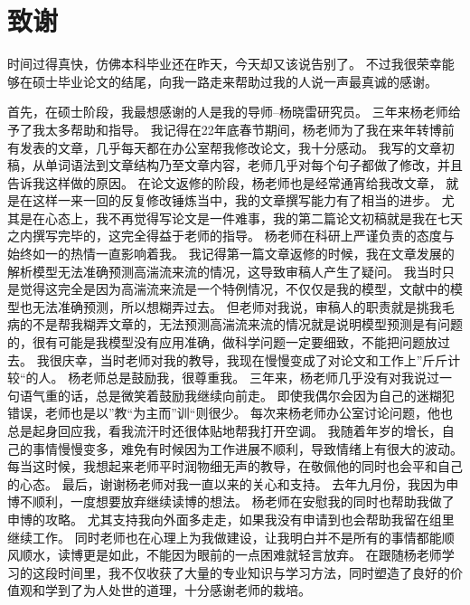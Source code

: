 \chapter[致谢]{致\quad 谢}%
时间过得真快，仿佛本科毕业还在昨天，今天却又该说告别了。
不过我很荣幸能够在硕士毕业论文的结尾，向我一路走来帮助过我的人说一声最真诚的感谢。

首先，在硕士阶段，我最想感谢的人是我的导师--杨晓雷研究员。
三年来杨老师给予了我太多帮助和指导。
我记得在22年底春节期间，杨老师为了我在来年转博前有发表的文章，几乎每天都在办公室帮我修改论文，我十分感动。
我写的文章初稿，从单词语法到文章结构乃至文章内容，老师几乎对每个句子都做了修改，并且告诉我这样做的原因。
在论文返修的阶段，杨老师也是经常通宵给我改文章，
就是在这样一来一回的反复修改锤炼当中，我的文章撰写能力有了相当的进步。
尤其是在心态上，我不再觉得写论文是一件难事，我的第二篇论文初稿就是我在七天之内撰写完毕的，这完全得益于老师的指导。
杨老师在科研上严谨负责的态度与始终如一的热情一直影响着我。
我记得第一篇文章返修的时候，我在文章发展的解析模型无法准确预测高湍流来流的情况，这导致审稿人产生了疑问。
我当时只是觉得这完全是因为高湍流来流是一个特例情况，不仅仅是我的模型，文献中的模型也无法准确预测，所以想糊弄过去。
但老师对我说，审稿人的职责就是挑我毛病的不是帮我糊弄文章的，无法预测高湍流来流的情况就是说明模型预测是有问题的，很有可能是我模型没有应用准确，做科学问题一定要细致，不能把问题放过去。
我很庆幸，当时老师对我的教导，我现在慢慢变成了对论文和工作上”斤斤计较“的人。
%
杨老师总是鼓励我，很尊重我。
三年来，杨老师几乎没有对我说过一句语气重的话，总是微笑着鼓励我继续向前走。
即使我偶尔会因为自己的迷糊犯错误，老师也是以”教“为主而”训“则很少。
每次来杨老师办公室讨论问题，他也总是起身回应我，看我流汗时还很体贴地帮我打开空调。
我随着年岁的增长，自己的事情慢慢变多，难免有时候因为工作进展不顺利，导致情绪上有很大的波动。
每当这时候，我想起来老师平时润物细无声的教导，在敬佩他的同时也会平和自己的心态。
%
最后，谢谢杨老师对我一直以来的关心和支持。
去年九月份，我因为申博不顺利，一度想要放弃继续读博的想法。
杨老师在安慰我的同时也帮助我做了申博的攻略。
尤其支持我向外面多走走，如果我没有申请到也会帮助我留在组里继续工作。
同时老师也在心理上为我做建设，让我明白并不是所有的事情都能顺风顺水，读博更是如此，不能因为眼前的一点困难就轻言放弃。
在跟随杨老师学习的这段时间里，我不仅收获了大量的专业知识与学习方法，同时塑造了良好的价值观和学到了为人处世的道理，十分感谢老师的栽培。

